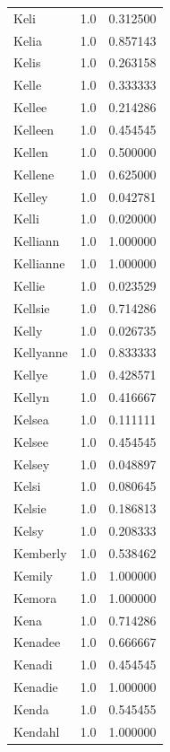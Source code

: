 \documentclass[
  letterpaper,
  DIV=11,
  numbers=noendperiod]{scrreprt}
\begin{document}
\begin{tabular}{lrr}
Keli            &   1.0 &   0.312500 \\
Kelia           &   1.0 &   0.857143 \\
Kelis           &   1.0 &   0.263158 \\
Kelle           &   1.0 &   0.333333 \\
Kellee          &   1.0 &   0.214286 \\
Kelleen         &   1.0 &   0.454545 \\
Kellen          &   1.0 &   0.500000 \\
Kellene         &   1.0 &   0.625000 \\
Kelley          &   1.0 &   0.042781 \\
Kelli           &   1.0 &   0.020000 \\
Kelliann        &   1.0 &   1.000000 \\
Kellianne       &   1.0 &   1.000000 \\
Kellie          &   1.0 &   0.023529 \\
Kellsie         &   1.0 &   0.714286 \\
Kelly           &   1.0 &   0.026735 \\
Kellyanne       &   1.0 &   0.833333 \\
Kellye          &   1.0 &   0.428571 \\
Kellyn          &   1.0 &   0.416667 \\
Kelsea          &   1.0 &   0.111111 \\
Kelsee          &   1.0 &   0.454545 \\
Kelsey          &   1.0 &   0.048897 \\
Kelsi           &   1.0 &   0.080645 \\
Kelsie          &   1.0 &   0.186813 \\
Kelsy           &   1.0 &   0.208333 \\
Kemberly        &   1.0 &   0.538462 \\
Kemily          &   1.0 &   1.000000 \\
Kemora          &   1.0 &   1.000000 \\
Kena            &   1.0 &   0.714286 \\
Kenadee         &   1.0 &   0.666667 \\
Kenadi          &   1.0 &   0.454545 \\
Kenadie         &   1.0 &   1.000000 \\
Kenda           &   1.0 &   0.545455 \\
Kendahl         &   1.0 &   1.000000 \\

\end{tabular}
\end{document}
